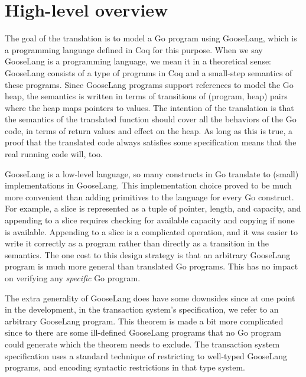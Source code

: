 
\section{High-level overview}

The goal of the translation is to model a Go program using GooseLang,
which is a programming language defined in Coq for this purpose. When we
say GooseLang is a programming language, we mean it in a theoretical
sense: GooseLang consists of a type of programs in Coq and a small-step
semantics of these programs. Since GooseLang programs support references
to model the Go heap, the semantics is written in terms of transitions
of (program, heap) pairs where the heap maps pointers to values. The
intention of the translation is that the semantics of the translated
function should cover all the behaviors of the Go code, in terms of
return values and effect on the heap. As long as this is true, a proof
that the translated code always satisfies some specification means that
the real running code will, too.

GooseLang is a low-level language, so many constructs in Go translate to
(small) implementations in GooseLang. This implementation choice proved
to be much more convenient than adding primitives to the language for
every Go construct. For example, a slice is represented as a tuple of
pointer, length, and capacity, and appending to a slice requires
checking for available capacity and copying if none is available.
Appending to a slice is a complicated operation, and it was easier to
write it correctly as a program rather than directly as a transition in
the semantics. The one cost to this design strategy is that an arbitrary
GooseLang program is much more general than translated Go programs. This
has no impact on verifying any \emph{specific} Go program.

The extra generality of GooseLang does have some downsides since at one point in
the development, in the transaction system's specification, we refer to an
arbitrary GooseLang program. This theorem is made a bit more complicated since
to there are some ill-defined GooseLang programs that no Go program could
generate which the theorem needs to exclude. The transaction system
specification uses a standard technique of restricting to well-typed GooseLang
programs, and encoding syntactic restrictions in that type system.


